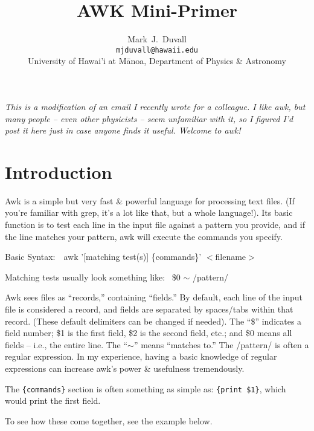 \documentclass[12pt]{article}
\begin{document}
\title{AWK Mini-Primer}
\author{Mark~J.~Duvall\\
\texttt{mjduvall@hawaii.edu}\\
University of Hawai'i at M\={a}noa, Department of Physics \& Astronomy}
\date{}
\maketitle




\emph{This is a modification of an email I recently wrote for a colleague. I like awk, but many people -- even other physicists -- seem unfamiliar with it, so I figured I'd post it here just in case anyone finds it useful. Welcome to awk!}


\section*{Introduction}


Awk is a simple but very fast \& powerful language for processing text files. (If you're familiar with grep, it's a lot like that, but a whole language!). Its basic function is to test each line in the input file against a pattern you provide, and if the line matches your pattern, awk will execute the commands you specify.


Basic Syntax: \,\, \ttfamily awk '[matching test(s)] \{commands\}' $<$filename$>$ \normalfont

Matching tests usually look something like:  \,  \$0 $\sim$ /pattern/

Awk sees files as ``records,'' containing ``fields.'' By default, each line of the input file is considered a record, and fields are separated by spaces/tabs within that record. (These default delimiters can be changed if needed). The ``\$'' indicates a field number; \$1 is the first field, \$2 is the second field, etc.; and \$0 means all fields -- i.e., the entire line. The ``$\sim$'' means ``matches to.'' The /pattern/ is often a regular expression. In my experience, having a basic knowledge of regular expressions can increase awk's power \& usefulness tremendously.

The \texttt{\{commands\}} section is often something as simple as:    \texttt{\{print \$1\}}, which would print the first field.

To see how these come together, see the example below.
\end{document}
